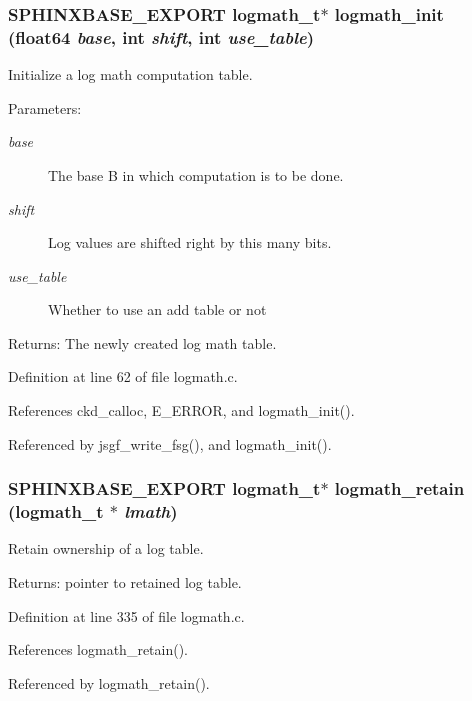\subsubsection[{logmath\_\-init}]{\setlength{\rightskip}{0pt plus 5cm}SPHINXBASE\_\-EXPORT {\bf logmath\_\-t}$\ast$ logmath\_\-init (float64 {\em base}, \/  int {\em shift}, \/  int {\em use\_\-table})}\label{logmath_8h_5835860c5f6a703c80c0214f816f0b11}


Initialize a log math computation table. 

\begin{Desc}
\item[Parameters:]
\begin{description}
\item[{\em base}]The base B in which computation is to be done. \item[{\em shift}]Log values are shifted right by this many bits. \item[{\em use\_\-table}]Whether to use an add table or not \end{description}
\end{Desc}
\begin{Desc}
\item[Returns:]The newly created log math table. \end{Desc}


Definition at line 62 of file logmath.c.

References ckd\_\-calloc, E\_\-ERROR, and logmath\_\-init().

Referenced by jsgf\_\-write\_\-fsg(), and logmath\_\-init().
\subsubsection[{logmath\_\-retain}]{\setlength{\rightskip}{0pt plus 5cm}SPHINXBASE\_\-EXPORT {\bf logmath\_\-t}$\ast$ logmath\_\-retain ({\bf logmath\_\-t} $\ast$ {\em lmath})}\label{logmath_8h_1c1b2ba3b137a39e9e835a8f3e27d381}


Retain ownership of a log table. 

\begin{Desc}
\item[Returns:]pointer to retained log table. \end{Desc}


Definition at line 335 of file logmath.c.

References logmath\_\-retain().

Referenced by logmath\_\-retain().